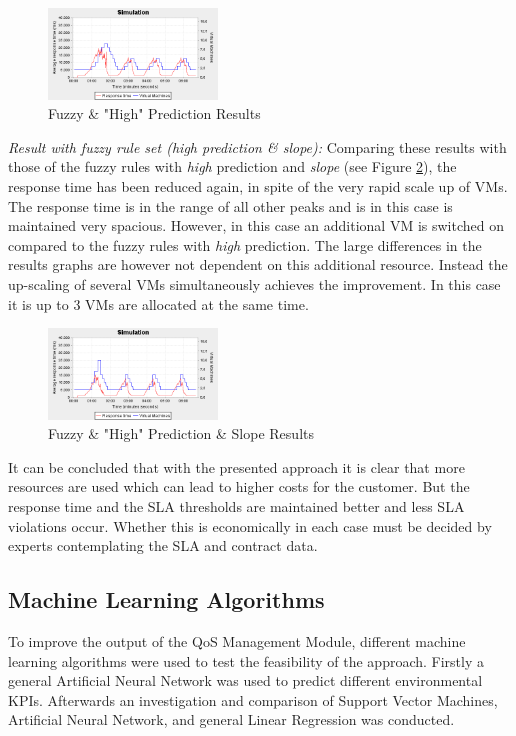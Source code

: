 \begin{figure}[ht]
\begin{center}
\includegraphics[width=0.40\textwidth]{fig/Testreihe2/03_prediction.png}
\end{center}
\caption{Fuzzy \& "High" Prediction Results}
\label{fig:s2high}
\end{figure}
\textit{Result with fuzzy rule set (high prediction \& slope):} Comparing these results with those of the fuzzy rules with \textit{high} prediction and \textit{slope} (see Figure \ref{fig:s2slope}), the response time has been reduced again, in spite of the very rapid scale up of VMs. The response time is in the range of all other peaks and is in this case is maintained very spacious. However, in this case an additional VM is switched on compared to the fuzzy rules with \textit{high} prediction. The large differences in the results graphs are however not  dependent on this additional resource. Instead the up-scaling of several VMs simultaneously achieves the improvement. In this case it is up to 3  VMs are allocated at the same time.


\begin{figure}[ht]
\begin{center}
\includegraphics[width=0.40\textwidth]{fig/Testreihe2/04_slope.png}
\end{center}
\caption{Fuzzy \& "High" Prediction \& Slope Results}
\label{fig:s2slope}
\end{figure}
It can be concluded that with the presented approach it is clear that more resources are used which can lead to higher costs for the customer. But the response time and the SLA thresholds are maintained better and less SLA violations occur. Whether this is economically in each case must be decided by experts contemplating the SLA and contract data.

\subsection{Machine Learning Algorithms}
To improve the output of the QoS Management Module, different machine learning algorithms were used to test the feasibility of the approach. Firstly a general Artificial Neural Network was used to predict different environmental KPIs. Afterwards an investigation and comparison of Support Vector Machines, Artificial Neural Network, and general Linear Regression was conducted.

